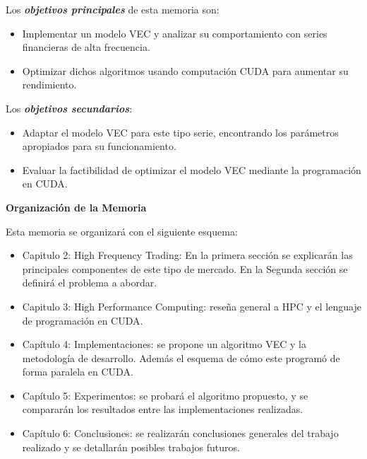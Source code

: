 Los \emph{\textbf{objetivos principales}} de esta memoria son:
\begin{itemize}
	\item Implementar un modelo VEC y analizar su comportamiento con
series financieras de alta frecuencia.
	\item Optimizar dichos algoritmos usando computación CUDA para aumentar su rendimiento.
\end{itemize} 

Los \emph{\textbf{objetivos secundarios}}:
\begin{itemize}
	\item Adaptar el modelo VEC para este tipo serie, encontrando
los parámetros apropiados para su funcionamiento.
	\item Evaluar la factibilidad de optimizar el modelo VEC mediante la programación en CUDA.
\end{itemize}


\textbf{Organización de la Memoria}

Esta memoria se organizará con el siguiente esquema:
\begin{itemize}
    \item Capitulo 2: High Frequency Trading: En la primera sección se
    explicarán las principales componentes de este tipo de mercado. En la
    Segunda sección se definirá el problema a abordar.
	\item Capitulo 3: High Performance Computing: reseña general a HPC y el 
	lenguaje de programación en CUDA.
    \item Capítulo 4: Implementaciones: se propone un algoritmo VEC y la
    metodología de desarrollo. Además el esquema de cómo este programó de forma
    paralela en CUDA.
    \item Capítulo 5: Experimentos: se probará el algoritmo propuesto, y se
    compararán los resultados entre las implementaciones realizadas.
    \item Capítulo 6: Conclusiones: se realizarán conclusiones generales del
    trabajo realizado y se detallarán posibles trabajos futuros.
\end{itemize}
